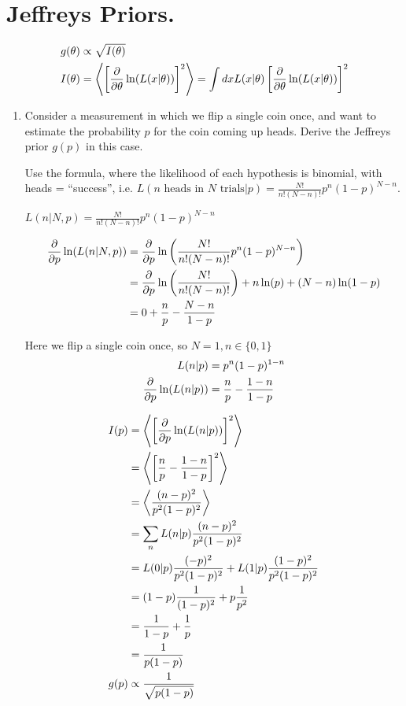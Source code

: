 \section{Jeffreys Priors.}

\begin{align*}
    g(\theta) &\propto \sqrt{I(\theta)}\\
    I(\theta) &= \left< \left[\frac{\partial}{\partial\theta} \ln(L(x|\theta))\right]^2 \right> = \int dx L(x|\theta) \left[\frac{\partial}{\partial\theta} \ln(L(x|\theta))\right]^2\\
\end{align*}

\begin{enumerate}[label=\textbf{\Alph*}.]
    \item Consider a measurement in which we flip a single coin once, and want to estimate the probability $p$ for the coin coming up heads. Derive the Jeffreys prior $g(p)$ in this case.

    Use the formula, where the likelihood of each hypothesis is binomial, with heads = ``success'', i.e. $L(n\text{ heads in } N \text{ trials}|p) = \frac{N!}{n!(N-n)!} p^n (1-p)^{N-n}$.

    $L(n|N, p) = \frac{N!}{n!(N-n)!} p^n (1-p)^{N-n}$

    \begin{align*}
        \frac{\partial}{\partial p} \ln(L(n|N, p)) &= \frac{\partial}{\partial p} \ln\left(\frac{N!}{n!(N-n)!} p^n (1-p)^{N-n}\right) \\
        &= \frac{\partial}{\partial p} \ln\left(\frac{N!}{n!(N-n)!}\right) + n\ln(p) + (N-n)\ln(1-p) \\
        &= 0 + \frac{n}{p} - \frac{N-n}{1-p} \\
    \end{align*}

    Here we flip a single coin once, so $N=1, n \in \{0,1\}$
    \begin{align*}
        L(n|p) &= p^n (1-p)^{1-n} \\
        \frac{\partial}{\partial p} \ln(L(n|p)) &= \frac{n}{p} - \frac{1-n}{1-p} \\
    \end{align*}

    \begin{align*}
        I(p) &=  \left< \left[\frac{\partial}{\partial p} \ln(L(n|p))\right]^2 \right> \\
        &= \left< \left[\frac{n}{p} - \frac{1-n}{1-p}\right]^2 \right> \\
        &= \left< \frac{(n-p)^2}{p^2(1-p)^2} \right> \\
        &= \sum_n L(n|p) \frac{(n-p)^2}{p^2(1-p)^2} \\
        &= L(0|p) \frac{(-p)^2}{p^2(1-p)^2} + L(1|p) \frac{(1-p)^2}{p^2(1-p)^2} \\
        &= (1-p) \frac{1}{(1-p)^2} + p \frac{1}{p^2} \\
        &= \frac{1}{1-p} + \frac{1}{p} \\
        &= \frac{1}{p(1-p)} \\
        g(p) &\propto \frac{1}{\sqrt{p(1-p)}} \\
    \end{align*}


\end{enumerate}
